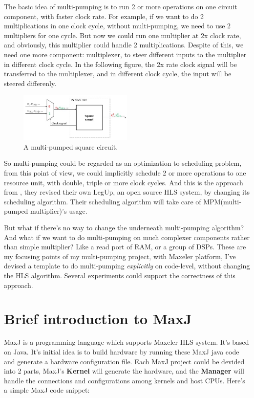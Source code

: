 \documentclass[a4paper, 10pt]{report}
\begin{document}
The basic idea of multi-pumping is to run 2 or more operations on one circuit component, with faster clock rate. For example, if we want to do 2 multiplications in one clock cycle, without multi-pumping, we need to use 2 multipliers for one cycle. But now we could run one multiplier at 2x clock rate, and obviously, this multiplier could handle 2 multiplications. Despite of this, we 
need one more component: multiplexer, to steer different inputs to the multiplier in different clock cycle. In the following figure, the 2x rate clock signal will be transferred to the multiplexer, and in different clock cycle, the input will be steered differenly. 

\begin{figure}[h!]
  \caption{A multi-pumped square circuit.}
  \centering
    \includegraphics[width=0.5\textwidth]{square-mp}
\end{figure}


So multi-pumping could be regarded as an optimization to scheduling problem, from this point of view, we could implicitly schedule 2 or more operations to one resource unit, with double, triple or more clock cycles. And this is the approach from \cite{Canis:2013}, they revised their own LegUp, an open source HLS system, by changing its scheduling algorithm. Their scheduling algorithm will take care of MPM(multi-pumped multiplier)'s usage.

But what if there's no way to change the underneath multi-pumping algorithm? And what if we want to do multi-pumping on much complexer components rather than simple multiplier? Like a read port of RAM, or a group of DSPs. These are my focusing points of my multi-pumping project, with Maxeler platform, I've devised a template to do multi-pumping \textit{explicitly} on code-level, without changing the HLS algorithm. Several experiments could support the correctness of this approach.
 
\section{Brief introduction to MaxJ}
MaxJ is a programming language which supports Maxeler HLS system. It's based on Java. It's initial idea is to build hardware by running these MaxJ java code and generate a hardware configuration file. Each MaxJ project could be devided into 2 parts, MaxJ's \textbf{Kernel} will generate the hardware, and the \textbf{Manager} will handle the connections and configurations among kernels and host CPUs. Here's a simple MaxJ code snippet:
\end{document}
